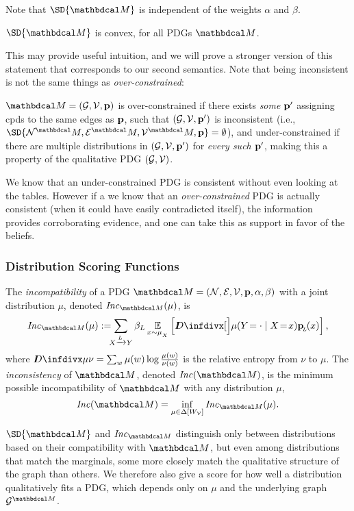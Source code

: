 \documentclass[the-pdg-manual.tex]{subfiles}
\begin{document}
	Note that $\SD{\dg M}$ is independent of the weights $\alpha$ and $\beta$.

	\begin{prop}[restate=thmsetconvex] 
		\label{prop:convex}
		$\SD{\dg M}$ is convex, for all PDGs $\dg M$.
	\end{prop}
		
	This may provide useful intuition, and we will prove a stronger version of this statement that corresponds to our second semantics.
	Note that being inconsistent is not the same things as \emph{over-constrained}: 	
	\begin{defn}
		$\dg M = (\Gr,\V,\mat p)$ is over-constrained if there exists
		  \emph{some $\mathbf p'$} assigning cpds to the same edges as
		  $\mathbf p$, such that $(\mathcal G, \mathcal V, \mathbf p')$ is inconsistent
		  (i.e., $\SD{\N^\dg M, \Ed^\dg M, \V^\dg M, \mat p}
			= \emptyset$), and under-constrained if there are
		  multiple distributions in $(\mathcal G, \mathcal V, \mathbf p')$ for
		  \emph{every such $\mathbf p'$}, making this a property of the
		  qualitative PDG $(\mathcal G, \mathcal V)$.  
	\end{defn}

	We know that an under-constrained PDG is consistent without even looking at the tables. However if a we know that an \emph{over-constrained} PDG is actually consistent (when it could have easily contradicted itself), the information provides corroborating evidence, and one can take this as support in favor of the beliefs. 


	\subsubsection{Distribution Scoring Functions}\label{sec:scoring-semantics}
	\begin{defn}\label{def:inc}
		The \emph{incompatibility} of a PDG $\dg M = \pdgvars[]$ with
		a joint distribution $\mu$, denoted $\Inc_{\dg M}(\mu)$, is  
		\[
		\Inc_{\dg M }( \mu) := 
		\!\!\!\sum\alle \beta_L \Ex_{x \sim \mu_{_X}}
		\left[\kldiv[\Big]{ \mu(Y\!= \cdot\mid X \!=\! x) }{\bp(x) } \right] ,
		\]
		where $\kldiv{\mu}{\nu} = \sum_{w} \mu(w) \log\frac{\mu(w)}{\nu(w)}$ is the 
		relative entropy from $\nu$ to $\mu$.
				The \emph{inconsistency} of $\dg M$, 
			denoted $\Inc(\dg M)$, is the
			minimum possible incompatibility of $\dg M$ with any
			distribution $\mu$,  
			\[ \Inc(\dg M) = \inf_{ \mu \in \Delta [W_{\cal V}]} \Inc_{\dg M}(\mu) . \]
	\end{defn}
	$\SD{\dg M}$ and $\Inc_{\dg M}$ distinguish only
	between distributions based on their compatibility with
	$\dg M$, but even among distributions that match the
	marginals, some more closely match the qualitative structure
	of the graph than others.  
	We therefore also give a score for how well a distribution qualitatively fits
	a PDG, which depends only on $\mu$ and the underlying graph $\Gr^{\dg M}$. 
		
\end{document}
